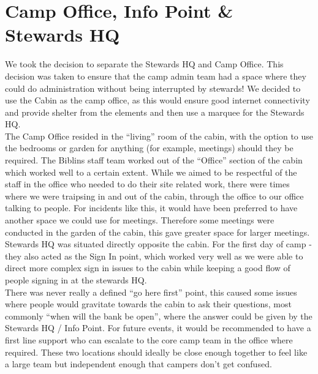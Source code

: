 \section{Camp Office, Info Point \& Stewards HQ}
We took the decision to separate the Stewards HQ and Camp Office. This decision was taken to ensure that the camp admin team had a space where they could do administration without being interrupted by stewards! We decided to use the Cabin as the camp office, as this would ensure good internet connectivity and provide shelter from the elements and then use a marquee for the Stewards HQ.\\

The Camp Office resided in the ``living'' room of the cabin, with the option to use the bedrooms or garden for anything (for example, meetings) should they be required. The Biblins staff team worked out of the ``Office'' section of the cabin which worked well to a certain extent. While we aimed to be respectful of the staff in the office who needed to do their site related work, there were times where we were traipsing in and out of the cabin, through the office to our office talking to people. For incidents like this, it would have been preferred to have another space we could use for meetings. Therefore some meetings were conducted in the garden of the cabin, this gave greater space for larger meetings.\\

Stewards HQ was situated directly opposite the cabin. For the first day of camp - they also acted as the Sign In point, which worked very well as we were able to direct more complex sign in issues to the cabin while keeping a good flow of people signing in at the stewards HQ. \\

There was never really a defined ``go here first'' point, this caused some issues where people would gravitate towards the cabin to ask their questions, most commonly ``when will the bank be open'', where the answer could be given by the Stewards HQ / Info Point. For future events, it would be recommended to have a first line support who can escalate to the core camp team in the office where required. These two locations should ideally be close enough together to feel like a large team but independent enough that campers don't get confused. 
